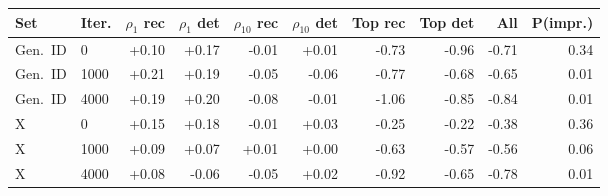 \begin{tabular}{llrrrrrrrr}
\toprule
Set & Iter. & $\rho_1$ rec & $\rho_1$ det & $\rho_{10}$ rec & $\rho_{10}$ det & Top rec & Top det & All & P(impr.) \\
\midrule
Gen.\ ID & 0 & +0.10 & +0.17 & -0.01 & +0.01 & -0.73 & -0.96 & -0.71 & 0.34 \\
Gen.\ ID & 1000 & +0.21 & +0.19 & -0.05 & -0.06 & -0.77 & -0.68 & -0.65 & 0.01 \\
Gen.\ ID & 4000 & +0.19 & +0.20 & -0.08 & -0.01 & -1.06 & -0.85 & -0.84 & 0.01 \\
X & 0 & +0.15 & +0.18 & -0.01 & +0.03 & -0.25 & -0.22 & -0.38 & 0.36 \\
X & 1000 & +0.09 & +0.07 & +0.01 & +0.00 & -0.63 & -0.57 & -0.56 & 0.06 \\
X & 4000 & +0.08 & -0.06 & -0.05 & +0.02 & -0.92 & -0.65 & -0.78 & 0.01 \\
\bottomrule
\end{tabular}
